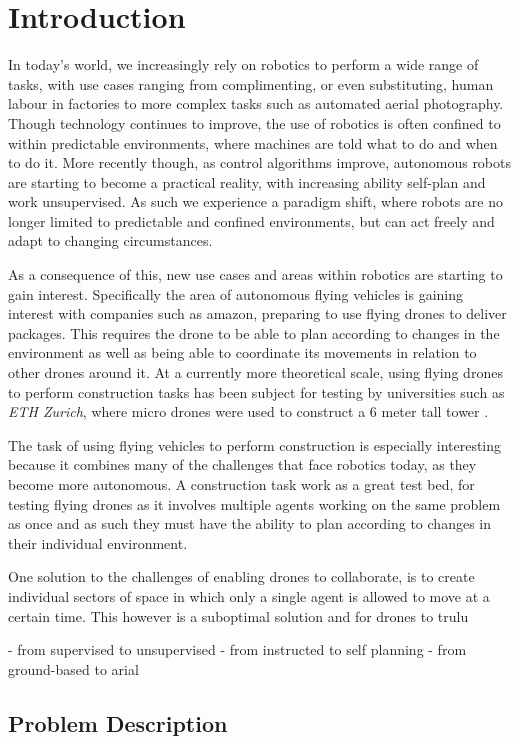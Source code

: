 \chapter{Introduction}

In today's world, we increasingly rely on robotics to perform a wide range of tasks, with use cases ranging from complimenting, or even substituting, human labour in factories to more complex tasks such as automated aerial photography. 
Though technology continues to improve, the use of robotics is often confined to within predictable environments, where machines are told what to do and when to do it. 
More recently though, as control algorithms improve, autonomous robots are starting to become a practical reality, with increasing ability self-plan and work unsupervised. 
As such we experience a paradigm shift, where robots are no longer limited to predictable and confined environments, but can act freely and adapt to changing circumstances. 

As a consequence of this, new use cases and areas within robotics are starting to gain interest. 
Specifically the area of autonomous flying vehicles is gaining interest with companies such as amazon, preparing to use flying drones to deliver packages.
This requires the drone to be able to plan according to changes in the environment as well as being able to coordinate its movements in relation to other drones around it. 
At a currently more theoretical scale, using flying drones to perform construction tasks has been subject for testing by universities such as \textit{ETH Zurich}, where micro drones were used to construct a 6 meter tall tower \cite{augugliaro_flight_2014}. 

The task of using flying vehicles to perform construction is especially interesting because it combines many of the challenges that face robotics today, as they become more autonomous. 
A construction task work as a great test bed, for testing flying drones as it involves multiple agents working on the same problem as once and as such they must have the ability to plan according to changes in their individual environment. 

One solution to the challenges of enabling drones to collaborate, is to create individual sectors of space in which only a single agent is allowed to move at a certain time. 
This however is a suboptimal solution and for drones to trulu

- from supervised to unsupervised
- from instructed to self planning
- from ground-based to arial
\section{Problem Description}




